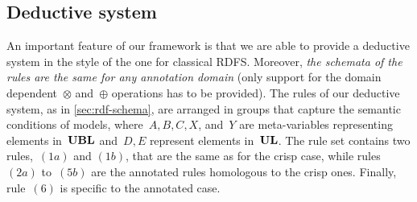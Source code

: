 \subsection{Deductive system}
\label{sec:anql-deductive-system}
An important feature of our framework is that we are able to provide a deductive system in the style of the one for
classical \ac{RDFS}.  Moreover, \emph{the schemata of the rules are the same for any annotation domain} (only support for the
domain dependent~$\otimes$ and~$\oplus$ operations has to be provided).
%
The rules of our deductive system, as in \cref{sec:rdf-schema}, are arranged in groups that capture the semantic
conditions of models, where~$A,B,C,X$, and~$Y$ are meta-variables representing elements in~$\mathbf{UBL}$ and~$D,E$ represent
elements in~$\mathbf{UL}$.
%
The rule set contains two rules,~$(1a)$ and $(1b)$, that are the same as for the crisp case, while rules~$(2a)$
to~$(5b)$ are the annotated rules homologous to the crisp ones. 
%
\ifnormalisedardf%
\else%
Finally, rule~$(6)$ is specific to the annotated case.
\fi%
%
